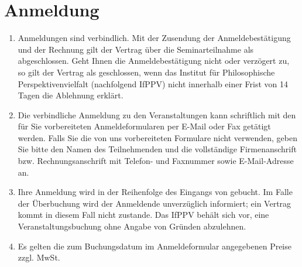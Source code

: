\documentclass[a4paper, 12pt]{scrartcl}
\begin{document}
    \section{Anmeldung}
    \begin{enumerate}
        \item Anmeldungen sind verbindlich.
        Mit der Zusendung der Anmeldebestätigung und der Rechnung gilt der Vertrag über die Seminarteilnahme als abgeschlossen.
        Geht Ihnen die Anmeldebestätigung nicht oder verzögert zu, so gilt der Vertrag als geschlossen, wenn das Institut f\"ur Philosophische Perspektivenvielfalt (nachfolgend IfPPV) nicht innerhalb einer Frist von 14 Tagen die Ablehnung erklärt.

        \item Die verbindliche Anmeldung zu den Veranstaltungen kann schriftlich mit den für Sie vorbereiteten Anmeldeformularen per E-Mail oder Fax getätigt werden.
        Falls Sie die von uns vorbereiteten Formulare nicht verwenden, geben Sie bitte den Namen des Teilnehmenden und die vollständige Firmenanschrift bzw. Rechnungsanschrift mit Telefon- und Faxnummer sowie E-Mail-Adresse an.

        \item Ihre Anmeldung wird in der Reihenfolge des Eingangs von gebucht.
        Im Falle der Überbuchung wird der Anmeldende unverzüglich informiert; ein Vertrag kommt in diesem Fall nicht zustande.
        Das IfPPV beh\"alt sich vor, eine Veranstaltungsbuchung ohne Angabe von Gr\"unden abzulehnen.

        \item Es gelten die zum Buchungsdatum im Anmeldeformular angegebenen Preise zzgl. MwSt.
    \end{enumerate}
\end{document}
